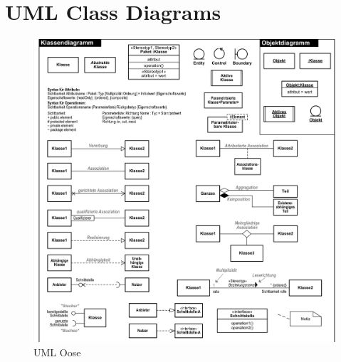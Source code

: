 \documentclass[../main/main.tex]{subfiles}
\begin{document}
\section{UML Class Diagrams}
\begin{figure}
  \includegraphics{../figures/uml_oose.png}  
  \caption{UML Oose}
  \label{fig:uml_oose}
\end{figure}
\end{document}
